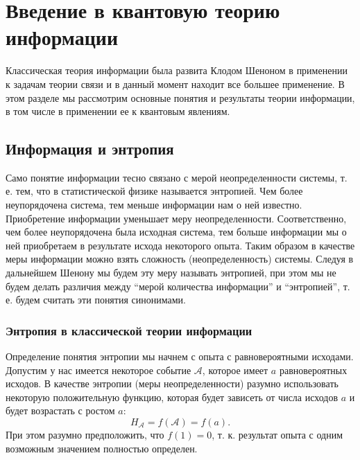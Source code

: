 \chapter{Введение в квантовую теорию информации}
\label{chQuantInfo}

Классическая теория информации была развита Клодом Шеноном
\cite{bShenon} в применении к задачам теории связи и в данный момент
находит все большее 
применение. В этом разделе мы рассмотрим основные понятия и результаты
теории информации, в том числе в применении ее к квантовым явлениям.

\section{Информация и энтропия}

Само понятие информации тесно связано с мерой неопределенности
системы, т. е. тем, что в статистической физике называется
энтропией. Чем более неупорядочена система, тем меньше информации нам
о ней известно. Приобретение информации уменьшает меру
неопределенности. Соответственно, чем более неупорядочена была исходная
система, тем больше информации мы о ней приобретаем в результате исхода
некоторого опыта. 
%
%
Таким образом в качестве меры информации можно взять сложность
(неопределенность) системы. Следуя в дальнейшем Шенону мы будем эту
меру называть энтропией, при этом мы не будем делать различия между
``мерой количества информации'' и ``энтропией'', т. е. будем считать эти
понятия синонимами.

\subsection{Энтропия в классической теории информации}

Определение понятия энтропии мы начнем с опыта с равновероятными
исходами. Допустим у нас имеется некоторое событие $\mathcal{A}$,
которое имеет $a$ равновероятных исходов. В качестве энтропии (меры
неопределенности) разумно использовать некоторую положительную функцию,
которая будет зависеть от числа исходов $a$ и будет возрастать с ростом $a$:
\begin{equation}
H_{\mathcal{A}} = f\left(\mathcal{A}\right) = f\left(a\right).
\nonumber
\end{equation}
При этом разумно предположить, что $f\left(1\right) = 0$, т. к. результат опыта с
одним возможным значением полностью определен.

